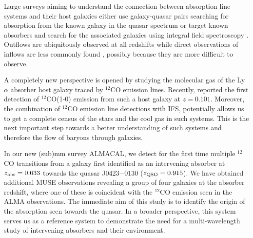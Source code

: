 \documentclass[a4paper,fleqn,usenatbib]{mnras}
\begin{document}
Large surveys aiming to understand the connection between absorption line systems and their host galaxies either use galaxy-quasar pairs searching for absorption from the known galaxy in the quasar spectrum \citep[e.g.][]{Tumlinson2013cos} or target known absorbers and search for the associated galaxies using integral field spectroscopy \citep[e.g.][]{Schroetter2016Megaflow, Rahmani2017observational, Bielby2017probing, Fumagalli2017witnessing, Peroux2017nature}. Outflows are ubiquitously observed at all redshifts \citep[e.g.][]{Rupke2005outflows, Veilleux2005galactic, Tremonti2007discovery, Weiner2009ubiquitous} %
while direct observations of inflows are less commonly found \citep[e.g.][]{Martin2012demographics, Bouche2013Signatures}, %
possibly because they are more difficult to observe.

A completely new perspective is opened by studying the molecular gas of the Ly~$\alpha$ absorber host galaxy traced by $^{12}$CO emission lines. Recently, \mbox{\citet{Neeleman2016first}} reported the first detection of $^{12}$CO(1-0) emission from such a host galaxy at $z=0.101$. Moreover, the combination of $^{12}$CO emission line detections with IFS, potentially allows us to get a complete census of the stars and the cool gas in such systems. This is the next important step towards a better understanding of such systems and therefore the flow of baryons through galaxies. %

In our new (sub)mm survey ALMACAL, we detect for the first time multiple $^{12}$CO transitions from a galaxy first identified as an intervening absorber at $z_{\rm abs} = 0.633$ towards the quasar J0423$-$0130 ($z_{\rm QSO} = 0.915$). We have obtained additional MUSE observations revealing a group of four galaxies at the absorber redshift, where one of these is coincident with the $^{12}$CO emission seen in the ALMA observations. The immediate aim of this study is to identify the origin of the absorption seen towards the quasar. In a broader perspective, this system serves us as a reference system to demonstrate the need for a multi-wavelength study of intervening absorbers and their environment.
\end{document}
